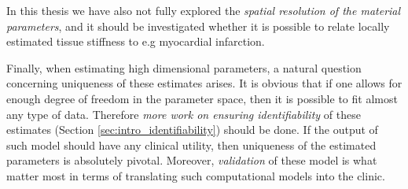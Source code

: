 In this thesis we have also not fully
explored the \emph{spatial resolution of the material parameters}, and it
should be investigated whether it is possible to relate locally estimated
tissue stiffness to e.g myocardial infarction.



Finally, when estimating high dimensional parameters, a natural question
concerning uniqueness of these estimates arises. It is obvious that if one allows for
enough degree of freedom in the parameter space, then it is possible
to fit almost any type of data. Therefore \emph{more work on ensuring
identifiability} of these estimates (Section
\ref{sec:intro_identifiability}) should be done. If the output of such
model should have any clinical utility, then uniqueness of the
estimated parameters is absolutely pivotal. Moreover, \emph{validation} of
these model is what matter most in terms of translating such computational
models into the clinic.




